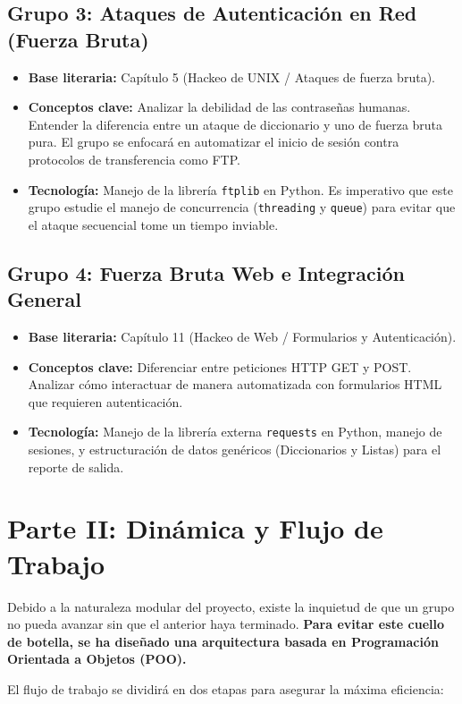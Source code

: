\documentclass[12pt,letterpaper]{article}
\begin{document}
\subsection*{Grupo 3: Ataques de Autenticación en Red (Fuerza Bruta)}
\begin{itemize}
    \item \textbf{Base literaria:} Capítulo 5 (Hackeo de UNIX / Ataques de fuerza bruta).
    \item \textbf{Conceptos clave:} Analizar la debilidad de las contraseñas humanas. Entender la diferencia entre un ataque de diccionario y uno de fuerza bruta pura. El grupo se enfocará en automatizar el inicio de sesión contra protocolos de transferencia como FTP.
    \item \textbf{Tecnología:} Manejo de la librería \texttt{ftplib} en Python. Es imperativo que este grupo estudie el manejo de concurrencia (\texttt{threading} y \texttt{queue}) para evitar que el ataque secuencial tome un tiempo inviable.
\end{itemize}

\subsection*{Grupo 4: Fuerza Bruta Web e Integración General}
\begin{itemize}
    \item \textbf{Base literaria:} Capítulo 11 (Hackeo de Web / Formularios y Autenticación).
    \item \textbf{Conceptos clave:} Diferenciar entre peticiones HTTP GET y POST. Analizar cómo interactuar de manera automatizada con formularios HTML que requieren autenticación.
    \item \textbf{Tecnología:} Manejo de la librería externa \texttt{requests} en Python, manejo de sesiones, y estructuración de datos genéricos (Diccionarios y Listas) para el reporte de salida.
\end{itemize}

\newpage
\section{Parte II: Dinámica y Flujo de Trabajo}
Debido a la naturaleza modular del proyecto, existe la inquietud de que un grupo no pueda avanzar sin que el anterior haya terminado. \textbf{Para evitar este cuello de botella, se ha diseñado una arquitectura basada en Programación Orientada a Objetos (POO).} 

\vspace{0.3cm}
El flujo de trabajo se dividirá en dos etapas para asegurar la máxima eficiencia:
\end{document}
